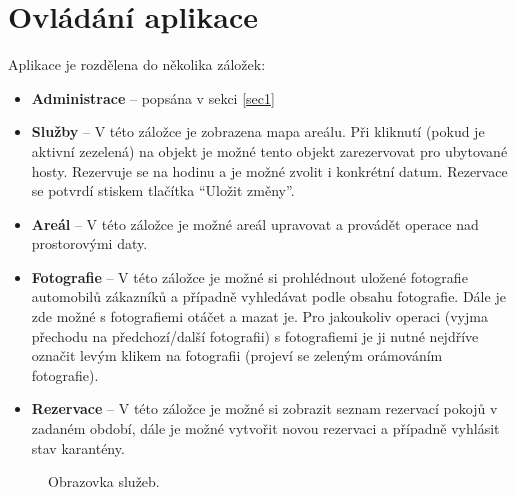 \documentclass[11pt,a4paper]{article}
\begin{document}
\section{Ovládání aplikace}
Aplikace je rozdělena do několika záložek: 
\begin{itemize}
\item \textbf{Administrace} -- popsána v sekci \ref{sec1}
\item \textbf{Služby} -- V této záložce je zobrazena mapa areálu. Při kliknutí (pokud je aktivní zezelená) na objekt je možné tento objekt zarezervovat pro ubytované hosty. Rezervuje se na hodinu a je možné zvolit i konkrétní datum. Rezervace se potvrdí stiskem tlačítka ``Uložit změny''.
\item \textbf{Areál} -- V této záložce je možné areál upravovat a provádět operace nad prostorovými daty.
\item \textbf{Fotografie} -- V této záložce je možné si prohlédnout uložené fotografie automobilů zákazníků a případně vyhledávat podle obsahu fotografie. Dále je zde možné s fotografiemi otáčet a mazat je. Pro jakoukoliv operaci (vyjma přechodu na předchozí/další fotografii) s fotografiemi je ji nutné nejdříve označit levým klikem na fotografii (projeví se zeleným orámováním fotografie).
\item \textbf{Rezervace} -- V této záložce je možné si zobrazit seznam rezervací pokojů v zadaném období, dále je možné vytvořit novou rezervaci a případně vyhlásit stav karantény.
\end{itemize}
\begin{figure}[h!]
\begin{center}
\caption{Obrazovka služeb.}
\label{sluzby}
\end{center}
\end{figure}
\end{document}
